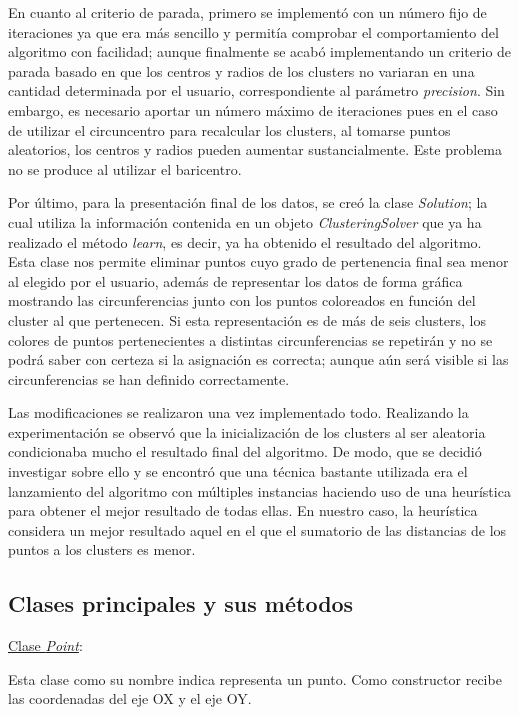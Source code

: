 \documentclass[conference,a4paper]{IEEEtran}
\begin{document}
En cuanto al criterio de parada, primero se implementó con un número fijo de iteraciones ya que era más sencillo y permitía comprobar el comportamiento del algoritmo con facilidad; aunque finalmente se acabó implementando un criterio de parada basado en que los centros y radios de los clusters no variaran en una cantidad determinada por el usuario, correspondiente al parámetro \textit{precision}. Sin embargo, es necesario aportar un número máximo de iteraciones pues en el caso de utilizar el circuncentro para recalcular los clusters, al tomarse puntos aleatorios, los centros y radios pueden aumentar sustancialmente. Este problema no se produce al utilizar el baricentro.

Por último, para la presentación final de los datos, se creó la clase  \textit{Solution}; la cual utiliza la información contenida en un objeto \textit{ClusteringSolver} que ya ha realizado el método  \textit{learn}, es decir, ya ha obtenido el resultado del algoritmo. Esta clase nos permite eliminar puntos cuyo grado de pertenencia final sea menor al elegido por el usuario, además de representar los datos de forma gráfica mostrando las circunferencias junto con los puntos coloreados en función del cluster al que pertenecen. Si esta representación es de más de seis clusters,  los colores de puntos pertenecientes a distintas circunferencias se repetirán y no se podrá saber con certeza si la asignación es correcta; aunque aún será visible si las circunferencias se han definido correctamente.

Las modificaciones se realizaron una vez implementado todo. Realizando la experimentación se observó que la inicialización de los clusters al ser aleatoria condicionaba mucho el resultado final del algoritmo. De modo, que se decidió investigar sobre ello y se encontró que una técnica bastante utilizada era el lanzamiento del algoritmo con múltiples instancias haciendo uso de una heurística para obtener el mejor resultado de todas ellas. En nuestro caso, la heurística  considera un mejor resultado aquel en el que el sumatorio de las distancias de los puntos a los clusters es menor.

\subsection{Clases principales y sus métodos}

\underline{Clase \textit{Point}}:

Esta clase como su nombre indica representa un punto. Como constructor recibe las coordenadas del eje OX y el eje OY.
\end{document}
